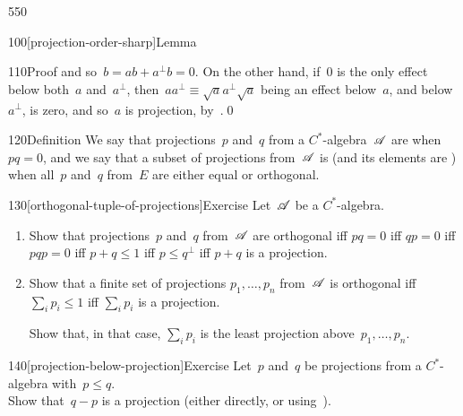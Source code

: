 \begin{parsec}{550}
\begin{point}{100}[projection-order-sharp]{Lemma}
\begin{point}{110}{Proof}
and so~$b=ab+a^\perp b = 0$.
On the other hand,
if~$0$ is the only effect below both~$a$ and~$a^\perp$,
then~$aa^\perp\equiv \sqrt{a}a^\perp \sqrt{a}$
being an effect below~$a$, and below~$a^\perp$,
is zero, and so~$a$ is projection, by~.\qed
\end{point}
\end{point}
\begin{point}{120}{Definition}%
We say that projections~$p$ and~$q$
from a $C^*$-algebra~$\mathscr{A}$ are %
when~$pq=0$,
and we say that a subset of projections
from~$\mathscr{A}$ is 
(and its elements are )
when all~$p$ and~$q$ from~$E$
are either equal or orthogonal.
\end{point}
\begin{point}{130}[orthogonal-tuple-of-projections]{Exercise}%
Let~$\mathscr{A}$ be a $C^*$-algebra.
\begin{enumerate}
\item
Show that projections~$p$ and~$q$ from~$\mathscr{A}$
are orthogonal iff $pq=0$ iff $qp=0$ iff $pqp=0$
iff $p+q\leq 1$ iff $p\leq q^\perp$
iff $p+q$ is a projection.
\item
Show that a finite set of  projections $p_1,\dotsc,p_n$
from~$\mathscr{A}$ is orthogonal
iff~$\sum_i p_i \leq 1$
iff $\sum_i p_i$ is a projection.

Show that, in that case, $\sum_i p_i$ is the least projection
above~$p_1,\dotsc,p_n$.
\end{enumerate}
\spacingfix%
\end{point}%
\begin{point}{140}[projection-below-projection]{Exercise}%
Let~$p$ and~$q$ be projections from a $C^*$-algebra
with~$p\leq q$.\\
Show that~$q-p$ is a projection
(either directly, or using~).
\end{point}
\end{parsec}
